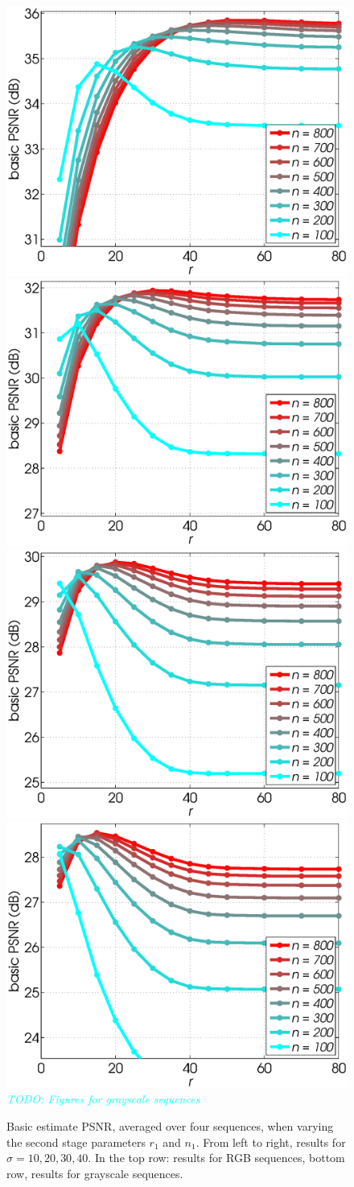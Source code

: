 \documentclass[10pt, journal, twocolumn, final, a4paper]{IEEEtran}
\newcommand{\pa}[1]{\textcolor{cyan}{#1}}
\newcommand{\pcomment}[1]{\textit{\pa{#1}}}
\begin{document}
\begin{figure}[htpb!]
	\begin{center}
		\includegraphics[width=.25\textwidth]{figs/params_tables/bpsnr_r1-np1-curves_s10_average_derf.eps}%
		\includegraphics[width=.25\textwidth]{figs/params_tables/bpsnr_r1-np1-curves_s20_average_derf.eps}%
		\includegraphics[width=.25\textwidth]{figs/params_tables/bpsnr_r1-np1-curves_s30_average_derf.eps}%
		\includegraphics[width=.25\textwidth]{figs/params_tables/bpsnr_r1-np1-curves_s40_average_derf.eps}\\

		\vspace{1cm}
		\pcomment{TODO: Figures for grayscale sequences}
		\vspace{1cm}

	\end{center}
	\caption{Basic estimate PSNR, averaged over four sequences, when varying the
		second stage parameters $r_1$ and $n_1$. From left to right, results for
		$\sigma = 10, 20, 30, 40$. In the top row: results for RGB sequences, bottom
		row, results for grayscale sequences.} 
	\label{fig:rank1-nsim1-bpsnr}
\end{figure}
\end{document}
